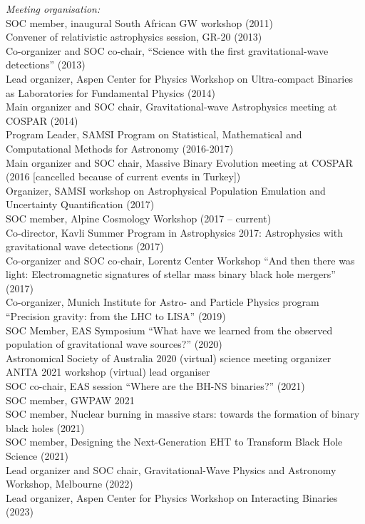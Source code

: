 \documentclass[margin,line]{res}
\begin{document}
\begin{resume}
{\it Meeting organisation:}\\
SOC member, inaugural South African GW workshop (2011)\\
Convener of relativistic astrophysics session, GR-20 (2013)\\
Co-organizer and SOC co-chair, ``Science with the first gravitational-wave detections'' (2013)\\
Lead organizer, Aspen Center for Physics Workshop on Ultra-compact Binaries as Laboratories for Fundamental Physics (2014)\\
Main organizer and SOC chair, Gravitational-wave Astrophysics meeting at COSPAR (2014)\\
Program Leader, SAMSI Program on Statistical, Mathematical and Computational Methods for Astronomy (2016-2017)\\
Main organizer and SOC chair, Massive Binary Evolution meeting at COSPAR (2016 [cancelled because of current events in Turkey])\\
Organizer, SAMSI workshop on Astrophysical Population Emulation and Uncertainty Quantification (2017)\\
SOC member, Alpine Cosmology Workshop (2017 -- current)\\
Co-director, Kavli Summer Program in Astrophysics 2017: Astrophysics with gravitational wave detections (2017)\\
Co-organizer and SOC co-chair, Lorentz Center Workshop ``And then there was light:  
Electromagnetic signatures of stellar mass binary black hole mergers'' (2017)\\
Co-organizer, Munich Institute for Astro- and Particle Physics program ``Precision gravity: from the LHC to LISA'' (2019)\\
SOC Member, EAS Symposium ``What have we learned from the observed population of gravitational wave sources?'' (2020)\\
Astronomical Society of Australia 2020 (virtual) science meeting organizer\\
ANITA 2021 workshop (virtual) lead organiser\\
SOC co-chair, EAS session ``Where are the BH-NS binaries?'' (2021)\\
SOC member, GWPAW 2021\\
SOC member, Nuclear burning in massive stars: towards the formation of binary black holes (2021)\\
SOC member, Designing the Next-Generation EHT to Transform Black Hole Science (2021)\\
Lead organizer and SOC chair, Gravitational-Wave Physics and Astronomy Workshop, Melbourne (2022)\\
Lead organizer, Aspen Center for Physics Workshop on Interacting Binaries (2023) \\


\end{resume}
\end{document}
